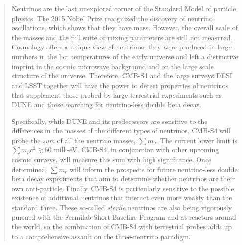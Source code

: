 \begin{quotation}

Neutrinos are the last unexplored corner of the Standard Model of particle physics.  The 2015 Nobel Prize recognized the discovery of neutrino oscillations, which shows that they have mass. However, the overall scale of the masses and the full suite of mixing parameters are still not measured.  Cosmology offers a unique view of neutrinos; they were produced in large numbers in the hot temperatures of the early universe and left a distinctive imprint in the cosmic microwave background and on the large scale structure of the universe. Therefore, CMB-S4 and the large surveys DESI and LSST together will have the power to detect properties of neutrinos that supplement those probed by large terrestrial experiments such as DUNE and those searching for neutrino-less double beta decay.

Specifically, while DUNE and its predecessors are sensitive to the differences in the masses of the different types of neutrinos, CMB-S4  will probe the {\it sum} of all the neutrino masses, $\sum m_\nu$. The current lower limit is $\sum m_\nu c^2 \gtrsim 60$ milli-eV. CMB-S4, in conjunction with other upcoming cosmic surveys, will measure this sum with high significance. Once determined, $\sum m_\nu$ will inform the prospects for future neutrino-less double beta decay experiments that aim to determine whether neutrinos are their own anti-particle. Finally, CMB-S4 is particularly sensitive to the possible existence of additional neutrinos that interact even more weakly than the standard three. These so-called {\it sterile} neutrinos are also being vigorously pursued with the Fermilab Short Baseline Program and at reactors around the world, so the combination of CMB-S4 with terrestrial probes adds up to a comprehensive assault on the three-neutrino paradigm. 






\end{quotation}
